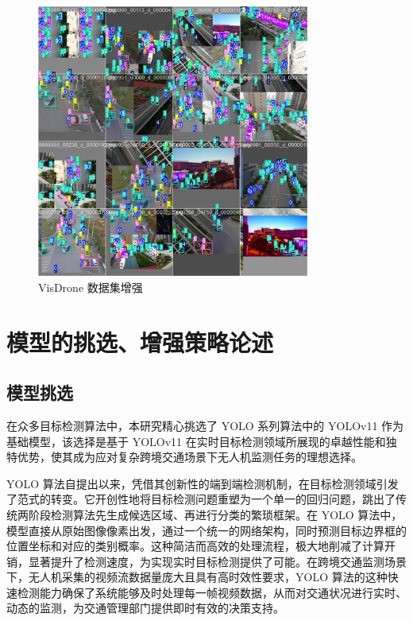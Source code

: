 \documentclass[runningheads]{llncs}
\begin{document}
\begin{figure}[H]
    \centering
    \includegraphics[width=0.8\textwidth]{../figure/vdtrain.png}
    \caption{VisDrone 数据集增强}
    \label{fig:vdtrain}
\end{figure}

\section{模型的挑选、增强策略论述}

\subsection{模型挑选}

在众多目标检测算法中，本研究精心挑选了 YOLO 系列算法\cite{yolov1, yolov2, yolov3, yolov4, yolov6, yolov7, yolov9, yolov10, yolov11}中的 YOLOv11 作为基础模型，该选择是基于 YOLOv11 在实时目标检测领域所展现的卓越性能和独特优势，使其成为应对复杂跨境交通场景下无人机监测任务的理想选择。

YOLO 算法自提出以来，凭借其创新性的端到端检测机制，在目标检测领域引发了范式的转变。它开创性地将目标检测问题重塑为一个单一的回归问题，跳出了传统两阶段检测算法\cite{fast_rcnn, faster_rcnn, mask_rcnn}先生成候选区域、再进行分类的繁琐框架。在 YOLO 算法中，模型直接从原始图像像素出发，通过一个统一的网络架构，同时预测目标边界框的位置坐标和对应的类别概率。这种简洁而高效的处理流程，极大地削减了计算开销，显著提升了检测速度，为实现实时目标检测提供了可能。在跨境交通监测场景下，无人机采集的视频流数据量庞大且具有高时效性要求，YOLO 算法的这种快速检测能力确保了系统能够及时处理每一帧视频数据，从而对交通状况进行实时、动态的监测，为交通管理部门提供即时有效的决策支持。
\end{document}

